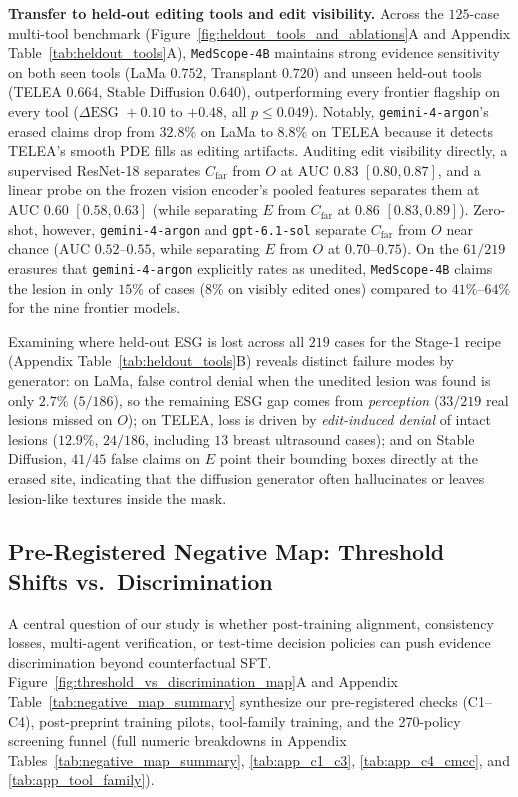 \documentclass{article} %
\begin{document}
\textbf{Transfer to held-out editing tools and edit visibility.} Across the $125$-case multi-tool benchmark (Figure~\ref{fig:heldout_tools_and_ablations}A and Appendix Table~\ref{tab:heldout_tools}A), \texttt{MedScope-4B} maintains strong evidence sensitivity on both seen tools (LaMa $0.752$, Transplant $0.720$) and unseen held-out tools (TELEA $0.664$, Stable Diffusion $0.640$), outperforming every frontier flagship on every tool ($\Delta\text{ESG } +0.10$ to $+0.48$, all $p \le 0.049$). Notably, \texttt{gemini-4-argon}'s erased claims drop from $32.8\%$ on LaMa to $8.8\%$ on TELEA because it detects TELEA's smooth PDE fills as editing artifacts. Auditing edit visibility directly, a supervised ResNet-18 separates $C_{\text{far}}$ from $O$ at $\text{AUC } 0.83$ $[0.80, 0.87]$, and a linear probe on the frozen vision encoder's pooled features separates them at $\text{AUC } 0.60$ $[0.58, 0.63]$ (while separating $E$ from $C_{\text{far}}$ at $0.86$ $[0.83, 0.89]$). Zero-shot, however, \texttt{gemini-4-argon} and \texttt{gpt-6.1-sol} separate $C_{\text{far}}$ from $O$ near chance ($\text{AUC } 0.52\text{--}0.55$, while separating $E$ from $O$ at $0.70\text{--}0.75$). On the $61/219$ erasures that \texttt{gemini-4-argon} explicitly rates as unedited, \texttt{MedScope-4B} claims the lesion in only $15\%$ of cases ($8\%$ on visibly edited ones) compared to $41\%\text{--}64\%$ for the nine frontier models.

Examining where held-out ESG is lost across all $219$ cases for the Stage-1 recipe (Appendix Table~\ref{tab:heldout_tools}B) reveals distinct failure modes by generator: on LaMa, false control denial when the unedited lesion was found is only $2.7\%$ ($5/186$), so the remaining ESG gap comes from \emph{perception} ($33/219$ real lesions missed on $O$); on TELEA, loss is driven by \emph{edit-induced denial} of intact lesions ($12.9\%$, $24/186$, including $13$ breast ultrasound cases); and on Stable Diffusion, $41/45$ false claims on $E$ point their bounding boxes directly at the erased site, indicating that the diffusion generator often hallucinates or leaves lesion-like textures inside the mask.

\subsection{Pre-Registered Negative Map: Threshold Shifts vs.\ Discrimination}
\label{subsec:exp_negative_map}
A central question of our study is whether post-training alignment, consistency losses, multi-agent verification, or test-time decision policies can push evidence discrimination beyond counterfactual SFT. Figure~\ref{fig:threshold_vs_discrimination_map}A and Appendix Table~\ref{tab:negative_map_summary} synthesize our pre-registered checks (C1--C4), post-preprint training pilots, tool-family training, and the 270-policy screening funnel (full numeric breakdowns in Appendix Tables~\ref{tab:negative_map_summary}, \ref{tab:app_c1_c3}, \ref{tab:app_c4_cmcc}, and \ref{tab:app_tool_family}).
\end{document}
